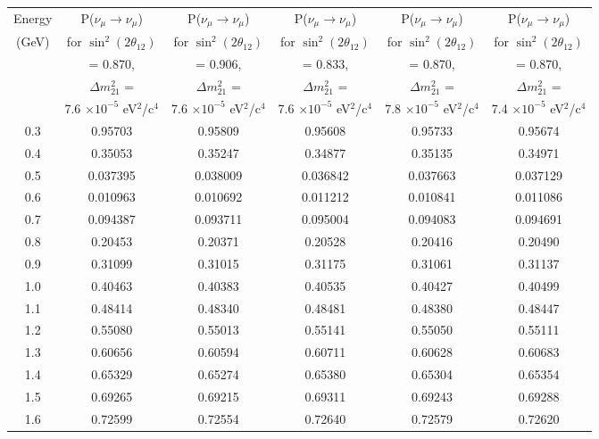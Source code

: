 \begin{table}
\centering
\begin{tabular}{| c | c | c | c | c | c |}
\hline
Energy & P($\nu_{\mu} \rightarrow \nu_{\mu}$) & P($\nu_{\mu} \rightarrow \nu_{\mu}$) &
       P($\nu_{\mu} \rightarrow \nu_{\mu}$) & P($\nu_{\mu} \rightarrow \nu_{\mu}$) & P($\nu_{\mu} \rightarrow \nu_{\mu}$) \\
(GeV) & for $\sin^{2}(2 \theta_{12})$ & for $\sin^{2}(2 \theta_{12})$ & for $\sin^{2}(2 \theta_{12})$
             & for $\sin^{2}(2 \theta_{12})$ & for $\sin^{2}(2 \theta_{12})$ \\
  & = 0.870, & = 0.906, & = 0.833, & = 0.870, & = 0.870, \\
  & $\Delta m_{21}^{2}$ = &  $\Delta m_{21}^{2}$ = & $\Delta m_{21}^{2}$ = & $\Delta m_{21}^{2}$ = & $\Delta m_{21}^{2}$ = \\
  & 7.6 $\times 10^{-5}$  eV$^{2}$/c$^{4}$ & 7.6 $\times 10^{-5}$  eV$^{2}$/c$^{4}$ & 7.6 $\times 10^{-5}$  eV$^{2}$/c$^{4}$ 
   & 7.8 $\times 10^{-5}$ eV$^{2}$/c$^{4}$ & 7.4 $\times 10^{-5}$  eV$^{2}$/c$^{4}$ \\
\hline
0.3 &  0.95703 &  0.95809 &  0.95608 &  0.95733 &  0.95674 \\
\hline
0.4 &  0.35053 &  0.35247 &  0.34877 &  0.35135 &  0.34971 \\
\hline
0.5 &  0.037395 &  0.038009 &  0.036842 &  0.037663 &  0.037129 \\
\hline
0.6 &  0.010963 &  0.010692 &  0.011212 &  0.010841 &  0.011086 \\
\hline
0.7 &  0.094387 &  0.093711 &  0.095004 &  0.094083 &  0.094691 \\
\hline
0.8 &  0.20453 &  0.20371 &  0.20528 &  0.20416 &  0.20490 \\
\hline
0.9 &  0.31099 &  0.31015 &  0.31175 &  0.31061 &  0.31137 \\
\hline
1.0 &  0.40463 &  0.40383 &  0.40535 &  0.40427 &  0.40499 \\
\hline
1.1 &  0.48414 &  0.48340 &  0.48481 &  0.48380 &  0.48447 \\
\hline
1.2 &  0.55080 &  0.55013 &  0.55141 &  0.55050 &  0.55111 \\
\hline
1.3 &  0.60656 &  0.60594 &  0.60711 &  0.60628 &  0.60683 \\
\hline
1.4 &  0.65329 &  0.65274 &  0.65380 &  0.65304 &  0.65354 \\
\hline
1.5 &  0.69265 &  0.69215 &  0.69311 &  0.69243 &  0.69288 \\
\hline
1.6 &  0.72599 &  0.72554 &  0.72640 &  0.72579 &  0.72620 \\

\end{tabular}
\end{table}
